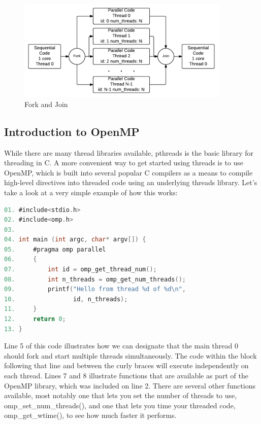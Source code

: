 \documentclass[a4paper, 11pt]{article}
\begin{document}
\begin{figure}[h]
	\begin{center}
		\includegraphics[width=0.9\textwidth]{figure1.pdf} 
		\caption{Fork and Join}
	\end{center}
\end{figure}

\subsection{Introduction to OpenMP}

While there are many thread libraries available, pthreads is the basic library for threading in C. A more convenient way to get started using threads is to use OpenMP, which is built into several popular C compilers as a means to compile high-level directives into threaded code using an underlying threads library. Let's take a look at a very simple example of how this works:

\pagebreak
%
%
\begin{lstlisting}[language=C]
01. #include<stdio.h>
02. #include<omp.h>
03. 
04. int main (int argc, char* argv[]) {
05.     #pragma omp parallel
06.     {
07.         int id = omp_get_thread_num();
08.         int n_threads = omp_get_num_threads();
09.         printf("Hello from thread %d of %d\n", 
10.                id, n_threads);
11.     }
12.     return 0;
13. }
\end{lstlisting}

Line 5 of this code illustrates how we can designate that the main thread 0 should fork and start multiple threads simultaneously. The code within the block following that line and between the curly braces will execute independently on each thread. Lines 7 and 8 illustrate functions that are available as part of the OpenMP library, which was included on line 2. There are several other functions available, most notably one that lets you set the number of threads to use, omp\_set\_num\_threads(), and one that lets you time your threaded code, omp\_get\_wtime(), to see how much faster it performs.
\end{document}
